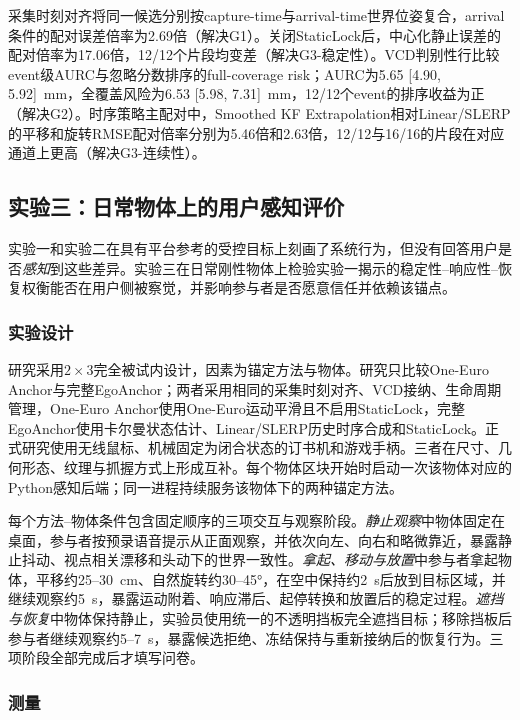 \documentclass[review]{vgtc}
\begin{document}
采集时刻对齐将同一候选分别按capture-time与arrival-time世界位姿复合，arrival条件的配对误差倍率为2.69倍（解决G1）。关闭StaticLock后，中心化静止误差的配对倍率为17.06倍，12/12个片段均变差（解决G3-稳定性）。VCD判别性行比较event级AURC与忽略分数排序的full-coverage risk；AURC为5.65 [4.90, 5.92]~mm，全覆盖风险为6.53 [5.98, 7.31]~mm，12/12个event的排序收益为正（解决G2）。时序策略主配对中，Smoothed KF Extrapolation相对Linear/SLERP的平移和旋转RMSE配对倍率分别为5.46倍和2.63倍，12/12与16/16的片段在对应通道上更高（解决G3-连续性）。

\subsection{实验三：日常物体上的用户感知评价}

实验一和实验二在具有平台参考的受控目标上刻画了系统行为，但没有回答用户是否\emph{感知}到这些差异。实验三在日常刚性物体上检验实验一揭示的稳定性--响应性--恢复权衡能否在用户侧被察觉，并影响参与者是否愿意信任并依赖该锚点。

\subsubsection{实验设计}

研究采用$2 \times 3$完全被试内设计，因素为锚定方法与物体。研究只比较One-Euro Anchor与完整EgoAnchor；两者采用相同的采集时刻对齐、VCD接纳、生命周期管理，One-Euro Anchor使用One-Euro运动平滑且不启用StaticLock，完整EgoAnchor使用卡尔曼状态估计、Linear/SLERP历史时序合成和StaticLock。正式研究使用无线鼠标、机械固定为闭合状态的订书机和游戏手柄。三者在尺寸、几何形态、纹理与抓握方式上形成互补。每个物体区块开始时启动一次该物体对应的Python感知后端；同一进程持续服务该物体下的两种锚定方法。

每个方法--物体条件包含固定顺序的三项交互与观察阶段。\emph{静止观察}中物体固定在桌面，参与者按预录语音提示从正面观察，并依次向左、向右和略微靠近，暴露静止抖动、视点相关漂移和头动下的世界一致性。\emph{拿起、移动与放置}中参与者拿起物体，平移约25--30~cm、自然旋转约30--45°，在空中保持约2~s后放到目标区域，并继续观察约5~s，暴露运动附着、响应滞后、起停转换和放置后的稳定过程。\emph{遮挡与恢复}中物体保持静止，实验员使用统一的不透明挡板完全遮挡目标；移除挡板后参与者继续观察约5--7~s，暴露候选拒绝、冻结保持与重新接纳后的恢复行为。三项阶段全部完成后才填写问卷。

\subsubsection{测量}
\end{document}
